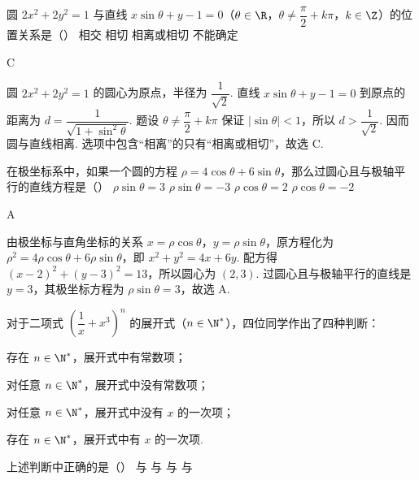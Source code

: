 \begin{problem}
圆 \(2x^{2}+2y^{2}=1\) 与直线 \(x\sin\theta+y-1=0\)（\(\theta\in\R\)，\(\theta\ne\dfrac{\pi}{2}+k\pi\)，\(k\in\Z\)）的位置关系是（\quad）
\choices
    {相交}
    {相切}
    {相离或相切}
    {不能确定}
\end{problem}

\begin{answer}
C
\end{answer}

\begin{solution}
圆 \(2x^{2}+2y^{2}=1\) 的圆心为原点，半径为 \(\dfrac{1}{\sqrt{2}}\). 直线 \(x\sin\theta+y-1=0\) 到原点的距离为
\(d=\dfrac{1}{\sqrt{1+\sin^{2}\theta}}\). 题设 \(\theta\ne\dfrac{\pi}{2}+k\pi\) 保证 \(\lvert\sin\theta\rvert<1\)，所以 \(d>\dfrac{1}{\sqrt{2}}\). 因而圆与直线相离. 选项中包含“相离”的只有“相离或相切”，故选 C.
\end{solution}

\begin{problem}
在极坐标系中，如果一个圆的方程 \(\rho=4\cos\theta+6\sin\theta\)，那么过圆心且与极轴平行的直线方程是（\quad）
\choices
    {\(\rho\sin\theta=3\)}
    {\(\rho\sin\theta=-3\)}
    {\(\rho\cos\theta=2\)}
    {\(\rho\cos\theta=-2\)}
\end{problem}

\begin{answer}
A
\end{answer}

\begin{solution}
由极坐标与直角坐标的关系 \(x=\rho\cos\theta\)，\(y=\rho\sin\theta\)，原方程化为 \(\rho^{2}=4\rho\cos\theta+6\rho\sin\theta\)，即 \(x^{2}+y^{2}=4x+6y\). 配方得 \((x-2)^{2}+(y-3)^{2}=13\)，所以圆心为 \((2,3)\). 过圆心且与极轴平行的直线是 \(y=3\)，其极坐标方程为 \(\rho\sin\theta=3\)，故选 A.
\end{solution}

\begin{problem}
对于二项式 \(\left(\dfrac1x+x^{3}\right)^{n}\) 的展开式（\(n\in\N^{*}\)），四位同学作出了四种判断：
\begin{circlelist}
\item 存在 \(n\in\N^{*}\)，展开式中有常数项；
\item 对任意 \(n\in\N^{*}\)，展开式中没有常数项；
\item 对任意 \(n\in\N^{*}\)，展开式中没有 \(x\) 的一次项；
\item 存在 \(n\in\N^{*}\)，展开式中有 \(x\) 的一次项.
\end{circlelist}
上述判断中正确的是（\quad）
\choices
    {与}
    {与}
    {与}
    {与}
\end{problem}

